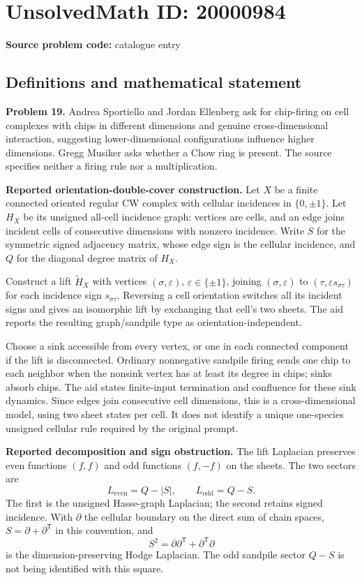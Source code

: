 \documentclass[11pt]{article}
\begin{document}
\section*{UnsolvedMath ID: 20000984}
\textbf{Source problem code:} catalogue entry
\subsection{Definitions and mathematical statement}
\textbf{Problem 19.} Andrea Sportiello and Jordan Ellenberg ask for chip-firing on cell complexes with chips in different dimensions and genuine cross-dimensional interaction, suggesting lower-dimensional configurations influence higher dimensions. Gregg Musiker asks whether a Chow ring is present. The source specifies neither a firing rule nor a multiplication.

\textbf{Reported orientation-double-cover construction.} Let $X$ be a finite connected oriented regular CW complex with cellular incidences in $\{0,\pm1\}$. Let $H_X$ be its unsigned all-cell incidence graph: vertices are cells, and an edge joins incident cells of consecutive dimensions with nonzero incidence. Write $S$ for the symmetric signed adjacency matrix, whose edge sign is the cellular incidence, and $Q$ for the diagonal degree matrix of $H_X$.

Construct a lift $\widetilde H_X$ with vertices $(\sigma,\varepsilon)$, $\varepsilon\in\{\pm1\}$, joining $(\sigma,\varepsilon)$ to $(\tau,\varepsilon s_{\sigma\tau})$ for each incidence sign $s_{\sigma\tau}$. Reversing a cell orientation switches all its incident signs and gives an isomorphic lift by exchanging that cell's two sheets. The aid reports the resulting graph/sandpile type as orientation-independent.

Choose a sink accessible from every vertex, or one in each connected component if the lift is disconnected. Ordinary nonnegative sandpile firing sends one chip to each neighbor when the nonsink vertex has at least its degree in chips; sinks absorb chips. The aid states finite-input termination and confluence for these sink dynamics. Since edges join consecutive cell dimensions, this is a cross-dimensional model, using two sheet states per cell. It does not identify a unique one-species unsigned cellular rule required by the original prompt.

\textbf{Reported decomposition and sign obstruction.} The lift Laplacian preserves even functions $(f,f)$ and odd functions $(f,-f)$ on the sheets. The two sectors are
\[
 L_{\mathrm{even}}=Q-|S|,\qquad L_{\mathrm{odd}}=Q-S.
\]
The first is the unsigned Hasse-graph Laplacian; the second retains signed incidence. With $\partial$ the cellular boundary on the direct sum of chain spaces, $S=\partial+\partial^{\mathsf T}$ in this convention, and
\[
 S^2=\partial\partial^{\mathsf T}+\partial^{\mathsf T}\partial
\]
is the dimension-preserving Hodge Laplacian. The odd sandpile sector $Q-S$ is not being identified with this square.
\end{document}

